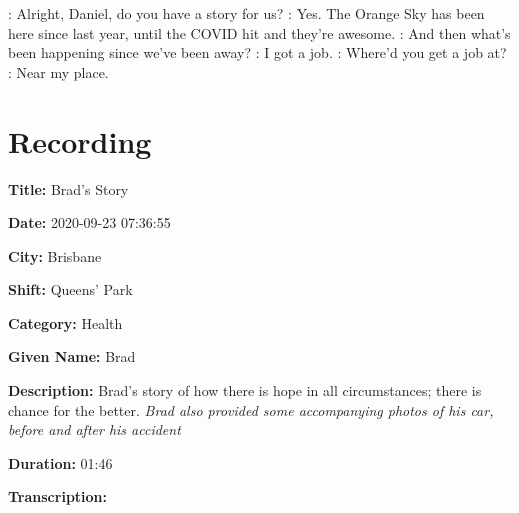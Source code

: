 {\begin{drama}

    \kelsspeaks: Alright, Daniel, do you have a story for us?
    \danspeaks: Yes. The Orange Sky has been here since last year, until the COVID hit and they're awesome.
    \kelsspeaks: And then what's been happening since we've been away?
    \danspeaks: I got a job.
    \kelsspeaks: Where'd you get a job at?
    \danspeaks: Near my place.
\end{drama}

\tocless\section{Recording }

\textbf{Title:} Brad's Story

\textbf{Date:} 2020-09-23 07:36:55

\textbf{City:} Brisbane

\textbf{Shift:} Queens' Park

\textbf{Category:} Health

\textbf{Given Name:} Brad

\textbf{Description:} Brad's story of how there is hope in all circumstances; there is chance for the better. \emph{Brad also provided some accompanying photos of his car, before and after his accident}

\textbf{Duration:} 01:46

\textbf{Transcription:}

\begin{drama}


\end{drama}}
